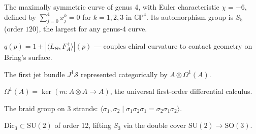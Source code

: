 \begin{definition}
  \label{def:brings-surface}
  The maximally symmetric curve of genus 4, with Euler
  characteristic $\chi = -6$, defined by $\sum_{j=0}^{4} x_j^k = 0$ for
  $k = 1,2,3$ in $\mathbb{CP}^4$.  Its automorphism group is
  $S_5$ (order $120$), the largest for any genus-$4$ curve.
\end{definition}

\begin{definition}
  \label{def:aether-parameter}
  $q(p) = 1 + |\langle L_\varTheta, F_A^+\rangle|(p)$ --- couples
  chiral curvature to contact geometry on Bring's surface.
\end{definition}

\begin{definition}
  \label{def:jet-prolongation}
  The first jet bundle $J^1 \mathcal{S}$ represented categorically by
  $A \otimes \Omega^1(A)$.
\end{definition}

\begin{definition}
  \label{def:kahler-differentials}
  $\Omega^1(A) = \ker(m : A \otimes A \to A)$, the universal
  first-order differential calculus.
\end{definition}

\begin{definition}
  \label{def:braid-group}
  The braid group on 3 strands: $\langle \sigma_1, \sigma_2 \mid
  \sigma_1\sigma_2\sigma_1 = \sigma_2\sigma_1\sigma_2 \rangle$.
\end{definition}

\begin{definition}
  \label{def:binary-dihedral}
  $\mathrm{Dic}_3 \subset \mathrm{SU}(2)$ of order 12, lifting $S_3$
  via the double cover $\mathrm{SU}(2) \to \mathrm{SO}(3)$.
\end{definition}

